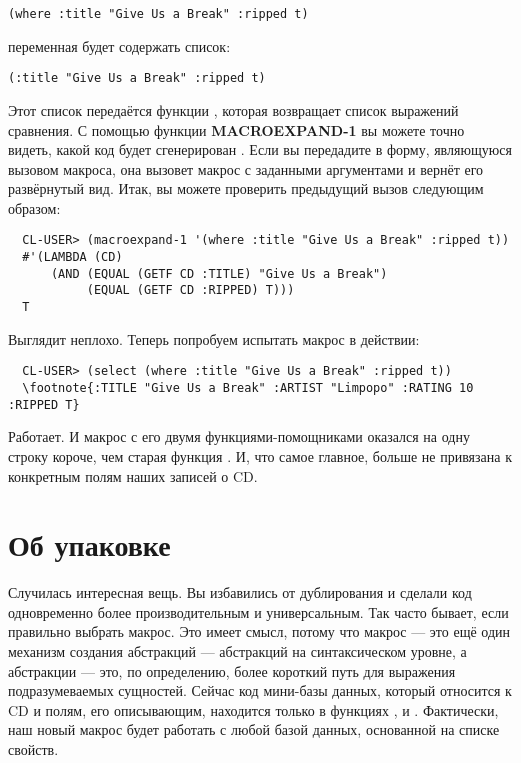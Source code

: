 \begin{lstlisting}
(where :title "Give Us a Break" :ripped t)
\end{lstlisting}

переменная  будет содержать список:

\begin{lstlisting}
(:title "Give Us a Break" :ripped t)
\end{lstlisting}

Этот список передаётся функции , которая возвращает список
выражений сравнения. С помощью функции \textbf{MACROEXPAND-1} вы можете точно видеть,
какой код будет сгенерирован . Если вы передадите в 
форму, являющуюся вызовом макроса, она вызовет макрос с заданными аргументами и вернёт его
развёрнутый вид. Итак, вы можете проверить предыдущий вызов  следующим
образом:

\begin{verbatim}
  CL-USER> (macroexpand-1 '(where :title "Give Us a Break" :ripped t))
  #'(LAMBDA (CD)
      (AND (EQUAL (GETF CD :TITLE) "Give Us a Break")
           (EQUAL (GETF CD :RIPPED) T)))
  T
\end{verbatim}

Выглядит неплохо. Теперь попробуем испытать макрос в действии:

\begin{verbatim}
  CL-USER> (select (where :title "Give Us a Break" :ripped t))
  \footnote{:TITLE "Give Us a Break" :ARTIST "Limpopo" :RATING 10 :RIPPED T}
\end{verbatim}

Работает. И макрос  с его двумя функциями-помощниками оказался на одну строку
короче, чем старая функция . И, что самое главное,  больше не
привязана к конкретным полям наших записей о CD.

\section{Об упаковке}

Случилась интересная вещь. Вы избавились от дублирования и сделали код одновременно более
производительным и универсальным. Так часто бывает, если правильно выбрать макрос. Это
имеет смысл, потому что макрос --- это ещё один механизм создания абстракций ---
абстракций на синтаксическом уровне, а абстракции --- это, по определению, более короткий
путь для выражения подразумеваемых сущностей. Сейчас код мини-базы данных, который
относится к CD и полям, его описывающим, находится только в функциях ,
 и . Фактически, наш новый макрос будет работать с любой
базой данных, основанной на списке свойств.

